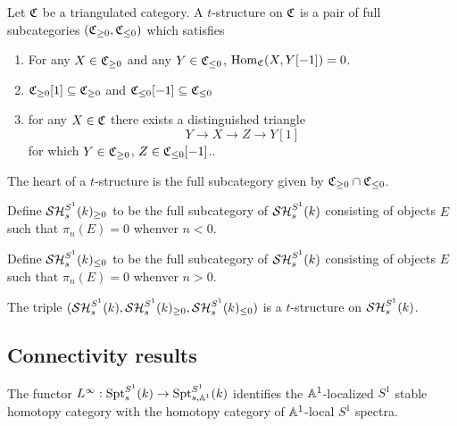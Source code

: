\documentclass{amsart}%
\begin{document}
\begin{definition}
  Let $\mathfrak{C}$ be a triangulated category. A $t$-structure on $\mathfrak{C}$
  is a pair of full subcategories $(\mathfrak{C}_{\geq 0}, \mathfrak{C}_{\leq 0})$
  which satisfies 
  \begin{enumerate}
      \item For any $X \in \mathfrak{C}_{\geq 0}$ and any
    $ Y \in \mathfrak{C}_{\leq 0}$, $\operatorname{Hom}_{\mathfrak{C}}(X, Y[-1])=0$.
      \item $\mathfrak{C}_{\geq 0}[1] \subseteq \mathfrak{C}_{\geq 0}$ and
    $\mathfrak{C}_{\leq 0}[-1] \subseteq \mathfrak{C}_{\leq 0}$

      \item for any $X \in \mathfrak{C}$ there exists a distinguished triangle 
    \begin{equation*}
      Y \to X \to Z \to Y[1]
    \end{equation*}
    for which $Y \in \mathfrak{C}_{\geq 0}$, $Z\in \mathfrak{C}_{\leq 0}[-1]$..
  \end{enumerate}

  The heart of a $t$-structure is the full subcategory given by
  $\mathfrak{C}_{\geq 0} \cap \mathfrak{C}_{\leq 0}$. 
\end{definition}

\begin{definition}[$t$-structure on $\SH_s^{S^1}(k)$]
  Define $\mathcal{SH}_s^{S^1}(k)_{\geq 0}$ to be the full subcategory of
  $\SH_s^{S^1}(k)$ consisting of objects $E$ such that $\pi_n(E)=0$
  whenver $n<0$.
  
  Define $\mathcal{SH}_s^{S^1}(k)_{\leq 0}$ to be the full subcategory of
  $\SH_s^{S^1}(k)$ consisting of objects $E$ such that $\pi_n(E)=0$
  whenver $n>0$.
\end{definition}

\begin{theorem}
  The triple
  $(\mathcal{SH}_s^{S^1}(k), \mathcal{SH}_s^{S^1}(k)_{\geq 0}, \mathcal{SH}_s^{S^1}(k)_{\leq 0})$
  is a $t$-structure on $\SH_s^{S^1}(k)$. 
\end{theorem}

\subsection{Connectivity results}

\begin{proposition}\cite[Lemma4.2.4]{Mor03}
  The functor
  $L^{\infty} : \mathrm{Spt}^{S^1}_s(k) \to \mathrm{Spt}^{S^1}_{s,\mathbb{A}^1}(k)$
  identifies the $\mathbb{A}^1$-localized $S^1$ stable homotopy category
  with the homotopy category of $\mathbb{A}^1$-local $S^1$ spectra.
\end{proposition}
\end{document}
